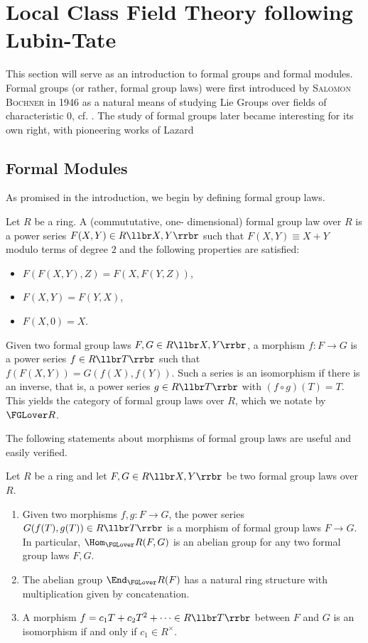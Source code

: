 \documentclass[../main.tex]{subfiles}
\begin{document}
\section{Local Class Field Theory following Lubin-Tate}

This section will serve as an introduction to formal groups and 
formal modules. Formal groups (or rather, formal group laws) were first
introduced by \textsc{Salomon Bochner} in 1946 as a natural means of studying Lie
Groups over fields of characteristic $0$, cf. \cite{Bochner1946FGrps}. 
The study of formal groups later became interesting for its own right, 
with pioneering works of Lazard \cite{Lazard1955FGrps}

\subsection{Formal Modules} %
\label{sub:Formal Modules}
As promised in the introduction, we begin by defining {formal group
laws}.

\begin{defi}
    Let $R$ be a ring. A (commututative, one-\allowbreak
    dimen\-sional) formal group law over $R$ is a power series $F(X,Y) \in
    R\llbr X, Y \rrbr$ such that $F(X,Y) \equiv X + Y$ modulo terms
    of degree $2$ and
    the following properties are satisfied:
    \begin{itemize}
        \item $F(F(X,Y),Z) = F(X,F(Y,Z))$,
        \item $F(X,Y) = F(Y,X)$,
        \item $F(X,0) = X$.
    \end{itemize}
\end{defi}
Given two formal group laws $F, G \in R\llbr X,Y\rrbr$, a morphism
$f: F\to G$ is a 
power series $f \in R\llbr T \rrbr$ such that $f(F(X,Y)) = G(f(X),f(Y))$.
Such a series is an isomorphism if there is an {inverse}, that
is, a power series $g \in R\llbr T \rrbr$ with $(f \circ g)(T) = T$.
This yields the category of formal group laws over $R$, which we notate by
$\FGLover R$.

The following statements about morphisms of formal group laws are 
useful and easily verified.
\begin{lem}\label{lem:FGLeasyfacts}
  Let $R$ be a ring and let $F,G \in R\llbr X,Y\rrbr$ be two formal
  group laws over $R$. 
  \begin{enumerate}
    \item Given two morphisms $f,g : F \to G$, the power series $G(f(T), g(T))
      \in R\llbr T \rrbr$ is a morphism of formal group laws 
      $F \to G$. In particular, $\Hom_\FGLover R(F,G)$ is an abelian
      group for any two formal group laws $F,G$.
    \item The abelian group $\End_\FGLover R(F)$ has a natural ring structure
      with multiplication given by concatenation.
    \item A morphism $f = c_1 T + c_2 T^2 + \dots \in R\llbr T \rrbr$ between
      $F$ and $G$ is an isomorphism if and only if $c_1 \in R^\times$.
  \end{enumerate}
\end{lem}
\end{document}
